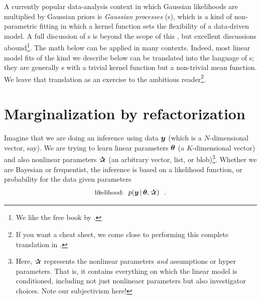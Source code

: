 A currently popular data-analysis context in which Gaussian likelihoods are
multiplied by Gaussian priors is \emph{Gaussian processes} (s),
which is a kind of
non-parametric fitting in which a kernel function sets the flexibility of a
data-driven model. A full discussion of s is beyond the scope of this
\documentname, but excellent discussions abound\footnote{We like the free
  book by \cite{Rasmussen:2005}.}.
The math below can be applied in many  contexts.
Indeed, most linear model fits of the kind we describe below can be translated
into the language of s;
they are generally s with a trivial kernel function but a non-trivial
mean function. We leave that translation as an exercise to the ambitious
reader\footnote{If you want a cheat sheet,
  we come close to performing this complete translation in \cite{luger}.}.


\section{Marginalization by refactorization}

Imagine that we are doing an inference using data $\boldsymbol{y}$ (which is a
$N$-dimensional vector, say).
We are trying to learn linear parameters $\boldsymbol{\theta}$ (a $K$-dimensional vector)
and also nonlinear parameters $\bP$ (an arbitrary vector, list, or
blob)\footnote{Here, $\bP$ represents the nonlinear parameters \emph{and}
  assumptions or hyper parameters. That is, it contains everything on which
  the linear model is conditioned, including not just nonlineaer parameters
  but also investigator choices. Note our subjectivism here!}.
Whether we are Bayesian or frequentist, the inference is based on
a likelihood function, or probability for the data given parameters
\begin{equation}
\mbox{\small likelihood:} \hquad p(\vy\given\vtheta,\bP) \hquad.
\end{equation}

